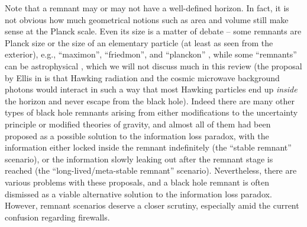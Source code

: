 \documentclass[12pt]{article}
\newcommand{\2}{$^2$}
\newcommand{\3}{$^3$}
\newcommand{\4}{$_4$}
\newcommand{\5}{$_5$}
\begin{document}
Note that a remnant may or may not have a well-defined horizon. In fact, it is not obvious how much geometrical notions such as area and volume still make sense at the Planck scale. Even its size is a matter of debate -- some remnants are Planck size or the size of an elementary particle (at least as seen from the exterior), e.g., ``maximon'', ``friedmon'', and ``planckon'' \cite{ACN, markov1, markov2, markov3, MM0, MM}, while some ``remnants'' can be astrophysical \cite{ellis}, which we will not discuss much in this review (the proposal by Ellis in \cite{ellis} is that Hawking radiation and the cosmic microwave background photons would interact in such a way that most Hawking particles end up \emph{inside} the horizon and never escape from the black hole).  %
Indeed there are many other types of black hole remnants arising from either modifications to the uncertainty principle or modified theories of gravity, and almost all of them had been proposed as a possible solution to the information loss paradox, with the information either locked inside the remnant indefinitely (the ``stable remnant'' scenario), or the information slowly leaking out after the remnant stage is reached (the ``long-lived/meta-stable remnant'' scenario). Nevertheless, there are various problems with these proposals, and a black hole remnant is often dismissed as a viable alternative solution to the information loss paradox. However, remnant scenarios deserve a closer scrutiny, especially amid the current confusion regarding firewalls. 
\end{document}
